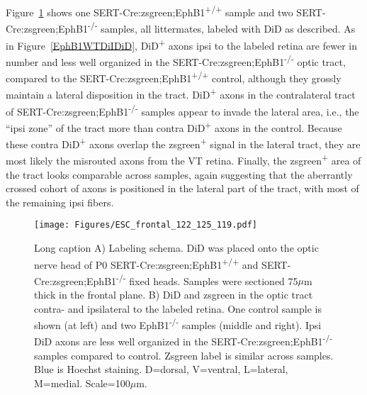 Figure~\ref{ESCfrontal} shows one SERT-Cre:zsgreen;EphB1\textsuperscript{+/+} sample and two SERT-Cre:zsgreen;EphB1\textsuperscript{-/-} samples, all littermates, labeled with DiD as described.
As in Figure~\ref{EphB1WTDiIDiD}, DiD\textsuperscript{+} axons ipsi to the labeled retina are fewer in number and less well organized in the SERT-Cre:zsgreen;EphB1\textsuperscript{-/-} optic tract, compared to the SERT-Cre:zsgreen;EphB1\textsuperscript{+/+} control, although they grossly maintain a lateral disposition in the tract.
DiD\textsuperscript{+} axons in the contralateral tract of SERT-Cre:zsgreen;EphB1\textsuperscript{-/-} samples appear to invade the lateral area, i.e., the ``ipsi zone'' of the tract more than contra DiD\textsuperscript{+} axons in the control.
Because these contra DiD\textsuperscript{+} axons overlap the zsgreen\textsuperscript{+} signal in the lateral tract, they are most likely the misrouted axons from the VT retina.
Finally, the zsgreen\textsuperscript{+} area of the tract looks comparable across samples, again suggesting that the aberrantly crossed cohort of axons is positioned in the lateral part of the tract, with most of the remaining ipsi fibers.
\begin{figure}[hbtp]
    \begin{center}
        \texttt{[image: Figures/ESC\_frontal\_122\_125\_119.pdf]}
        \caption[Short caption]
        {Long caption
		A) Labeling schema.
		DiD was placed onto the optic nerve head of P0 SERT-Cre:zsgreen;EphB1\textsuperscript{+/+} and SERT-Cre:zsgreen;EphB1\textsuperscript{-/-} fixed heads.
		Samples were sectioned 75$\mu$m thick in the frontal plane.
		B) DiD and zsgreen in the optic tract contra- and ipsilateral to the labeled retina. 
		One control sample is shown (at left) and two EphB1\textsuperscript{-/-} samples (middle and right).
		Ipsi DiD axons are less well organized in the SERT-Cre:zsgreen;EphB1\textsuperscript{-/-} samples compared to control.
		Zsgreen label is similar across samples.
		Blue is Hoechst staining.
		D=dorsal, V=ventral, L=lateral, M=medial.
		Scale=100$\mu$m.}
        \label{ESCfrontal}
    \end{center}
\end{figure}

